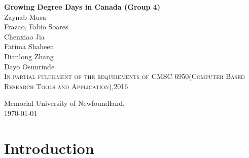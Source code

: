 \documentclass[12pt]{article}
\begin{document}
\begin{titlepage}
	\begin{center}
	
	
	{\Large \bf
Growing Degree Days in Canada (Group 4) \\

\vspace*{0.4in}
}
Zaynab Musa\\ 
Frazao, Fabio Soares\\
Chenxiao Jia\\
Fatima Shaheen\\
Dianlong Zhang\\
Dayo Osunrinde\\

\vspace*{0.3in}  
\textsc{\small In partial fulfilment of the requirements of CMSC 6950(Computer Based Research Tools and Application),2016}

\end{center}
\vspace*{4.7in}
\begin{flushleft}
{\textsc Memorial University of Newfoundland,} \\
\today
\end{flushleft}
\end{titlepage}

\newpage
\begin{abstract}
Growing Degree Days (GDDs) are used to estimate the growth and development of plants and insects during the growing season. Heat units expressed in growing degree days(GDDs) are frequently used to describe the timing of biological process

The objective of this paper is to calculate the GDD for selected cities in Canada. We  also provide a visual representation of the accumulated GDD for selected cities in Canada over a given period.A visual examination of the annual cycle of minimum and maximum daily temperatures for canadian cities is explored.


 Finally, we explore how the GDD calculation depends on the base temperature for selected cities in Canada.\\



 Keywords -- {\bf Growing Degree Days(GDDs)}


\end{abstract}
\newpage
\tableofcontents
\listoffigures
\newpage
\section{ \bf Introduction}
\end{document}
